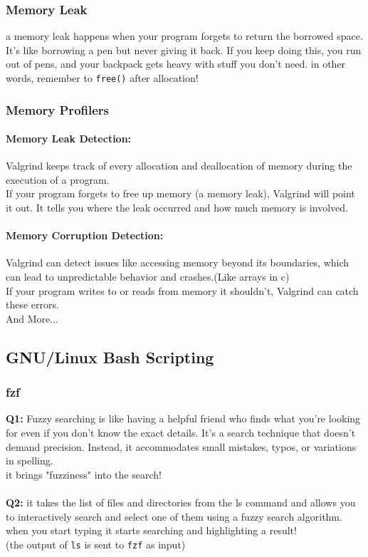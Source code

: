 \documentclass[titlepage]{article}
\begin{document}
\subsubsection{Memory Leak}
a memory leak happens when your program forgets to return the borrowed space. It's like borrowing a pen but never giving it back. If you keep doing this, you run out of pens, and your backpack gets heavy with stuff you don't need.\newline
in other words, remember to \texttt{free()} after allocation!
\subsubsection{Memory Profilers}
\paragraph{Memory Leak Detection:}
Valgrind keeps track of every allocation and deallocation of memory during the execution of a program.\\
If your program forgets to free up memory (a memory leak), Valgrind will point it out. It tells you where the leak occurred and how much memory is involved.
\paragraph{Memory Corruption Detection:}
Valgrind can detect issues like accessing memory beyond its boundaries, which can lead to unpredictable behavior and crashes.(Like arrays in c)\\
If your program writes to or reads from memory it shouldn't, Valgrind can catch these errors.
\\And More...
\subsection{GNU/Linux Bash Scripting}
\subsubsection{fzf}
\textbf{Q1: }Fuzzy searching is like having a helpful friend who finds what you're looking for even if you don't know the exact details. It's a search technique that doesn't demand precision. Instead, it accommodates small mistakes, typos, or variations in spelling.
\\ it brings "fuzziness" into the search!
\\\\
\textbf{Q2: }it takes the list of files and directories from the ls command and allows you to interactively search and select one of them using a fuzzy search algorithm.\\
when you start typing it starts searching and highlighting a result!\\
(the output of \texttt{ls} is sent to \texttt{fzf} as input)
\end{document}

